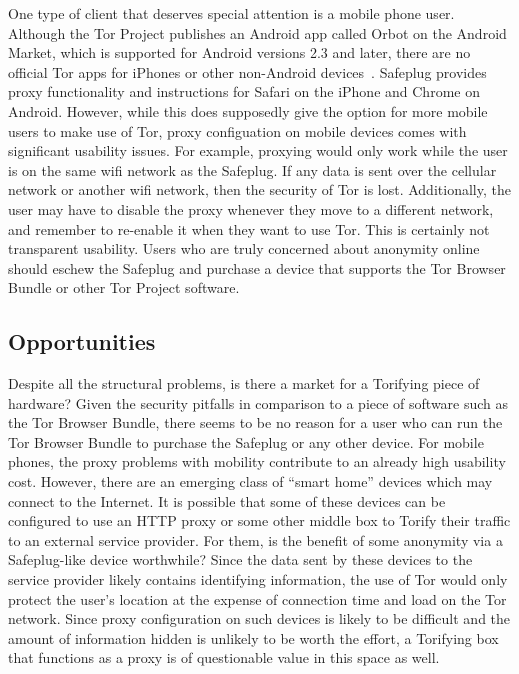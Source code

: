 \documentclass[letterpaper,twocolumn,10pt]{article}
\begin{document}
One type of client that deserves special attention is a mobile phone user.  Although the Tor Project publishes an Android app called Orbot on the Android Market, which is supported for Android versions 2.3 and later, there are no official Tor apps for iPhones or other non-Android devices~\cite{orbot,amorbot}.  Safeplug provides proxy functionality and instructions for Safari on the iPhone and Chrome on Android.  However, while this does supposedly give the option for more mobile users to make use of Tor, proxy configuation on mobile devices comes with significant usability issues.  For example, proxying would only work while the user is on the same wifi network as the Safeplug.  If any data is sent over the cellular network or another wifi network, then the security of Tor is lost.  Additionally, the user may have to disable the proxy whenever they move to a different network, and remember to re-enable it when they want to use Tor.  This is certainly not transparent usability.  Users who are truly concerned about anonymity online should eschew the Safeplug and purchase a device that supports the Tor Browser Bundle or other Tor Project software.

\subsection{Opportunities}
Despite all the structural problems, is there a market for a Torifying piece of hardware?  Given the security pitfalls in comparison to a piece of software such as the Tor Browser Bundle, there seems to be no reason for a user who can run the Tor Browser Bundle to purchase the Safeplug or any other device.  For mobile phones, the proxy problems with mobility contribute to an already high usability cost.  However, there are an emerging class of ``smart home'' devices which may connect to the Internet.  It is possible that some of these devices can be configured to use an HTTP proxy or some other middle box to Torify their traffic to an external service provider.  For them, is the benefit of some anonymity via a Safeplug-like device worthwhile?  Since the data sent by these devices to the service provider likely contains identifying information, the use of Tor would only protect the user's location at the expense of connection time and load on the Tor network.  Since proxy configuration on such devices is likely to be difficult and the amount of information hidden is unlikely to be worth the effort, a Torifying box that functions as a proxy is of questionable value in this space as well.
\end{document}
